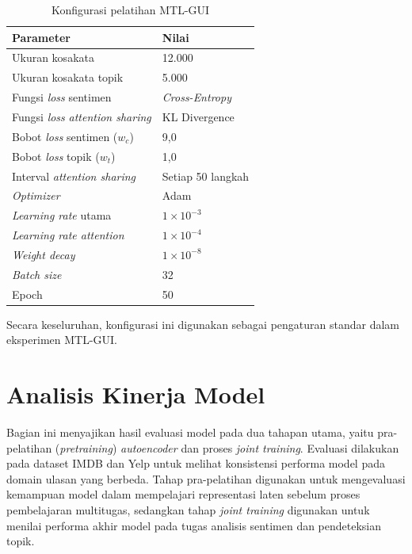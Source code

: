 \begin{table}[H]
    \centering
    \caption{Konfigurasi pelatihan MTL-GUI}
    \label{tab:config_mtlgui_train}
    \renewcommand{\arraystretch}{1.15}
    \begin{tabular}{L{5.0cm} L{6.5cm}}
        \toprule
        \textbf{Parameter} & \textbf{Nilai} \\
        \midrule
        Ukuran kosakata                         & 12.000 \\
        Ukuran kosakata topik                   & 5.000 \\
        Fungsi \textit{loss} sentimen           & \textit{Cross-Entropy} \\
        Fungsi \textit{loss} \textit{attention sharing} & KL Divergence \\
        Bobot \textit{loss} sentimen ($w_c$)    & 9{,}0 \\
        Bobot \textit{loss} topik ($w_t$)       & 1{,}0 \\
        Interval \textit{attention sharing}     & Setiap 50 langkah \\
        \textit{Optimizer}                      & Adam \\
        \textit{Learning rate} utama            & $1 \times 10^{-3}$ \\
        \textit{Learning rate attention}        & $1 \times 10^{-4}$ \\
        \textit{Weight decay}                   & $1 \times 10^{-8}$ \\
        \textit{Batch size}                     & 32 \\
        Epoch                                   & 50 \\
        \bottomrule
    \end{tabular}
\end{table}

Secara keseluruhan, konfigurasi ini digunakan sebagai pengaturan standar dalam eksperimen MTL-GUI.

\section{Analisis Kinerja Model}

Bagian ini menyajikan hasil evaluasi model pada dua tahapan utama, yaitu
pra-pelatihan (\textit{pretraining}) \textit{autoencoder} dan proses
\textit{joint training}. Evaluasi dilakukan pada dataset IMDB dan Yelp
untuk melihat konsistensi performa model pada domain ulasan yang berbeda.
Tahap pra-pelatihan digunakan untuk mengevaluasi kemampuan model dalam
mempelajari representasi laten sebelum proses pembelajaran multitugas,
sedangkan tahap \textit{joint training} digunakan untuk menilai performa
akhir model pada tugas analisis sentimen dan pendeteksian topik.

